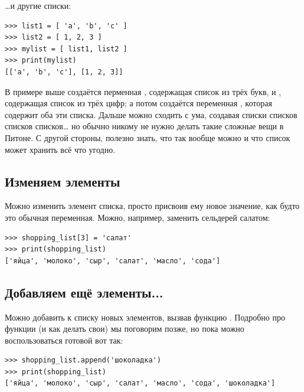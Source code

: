 …и другие списки:

\begin{listing}
\begin{verbatim}
>>> list1 = [ 'a', 'b', 'c' ]
>>> list2 = [ 1, 2, 3 ]
>>> mylist = [ list1, list2 ]
>>> print(mylist)
[['a', 'b', 'c'], [1, 2, 3]]
\end{verbatim}
\end{listing}

В примере выше создаётся перменная , содержащая список из трёх букв, и , содержащая список из трёх цифр; а потом создаётся переменная , которая содержит оба эти списка. Дальше можно сходить с ума, создавая списки списков списков списков… но обычно никому не нужно делать такие сложные вещи в Питоне. С другой стороны, полезно знать, что так вообще можно и что список может хранить всё что угодно.


\subsection*{\color{BrickRed}Изменяем элементы}

Можно изменить элемент списка, просто присвоив ему новое значение, как будто это обычная переменная. Можно, например, заменить сельдерей салатом:

\begin{listing}
\begin{verbatim}
>>> shopping_list[3] = 'салат'
>>> print(shopping_list)
['яйца', 'молоко', 'сыр', 'салат', 'масло', 'сода']
\end{verbatim}
\end{listing}

\subsection*{\color{BrickRed}Добавляем ещё элементы...}

Можно добавить к списку новых элементов, вызвав функцию . Подробно про функции (и как делать свои) мы поговорим позже, но пока можно воспользоваться готовой вот так:

\begin{listing}
\begin{verbatim}
>>> shopping_list.append('шоколадка')
>>> print(shopping_list)
['яйца', 'молоко', 'сыр', 'салат', 'масло', 'сода', 'шоколадка']
\end{verbatim}
\end{listing}

